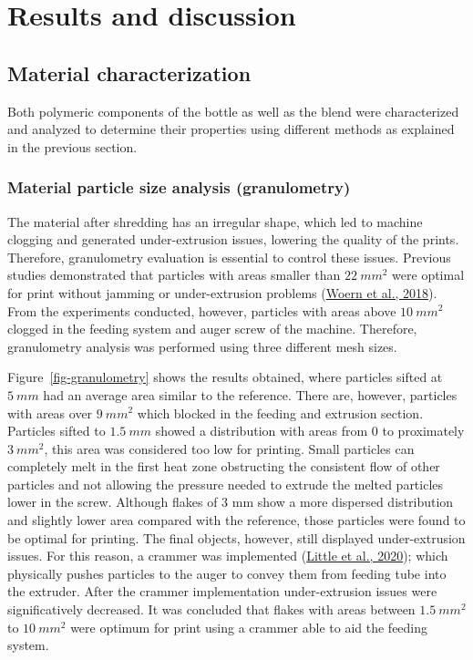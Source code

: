 \documentclass[
  12pt,
  number,
  review]{elsarticle}
\begin{document}
\hypertarget{results-and-discussion}{%
\section{Results and discussion}\label{results-and-discussion}}

\hypertarget{material-characterization}{%
\subsection{Material characterization}\label{material-characterization}}

Both polymeric components of the bottle as well as the blend were
characterized and analyzed to determine their properties using different
methods as explained in the previous section.

\hypertarget{material-particle-size-analysis-granulometry}{%
\subsubsection{Material particle size analysis
(granulometry)}\label{material-particle-size-analysis-granulometry}}

The material after shredding has an irregular shape, which led to
machine clogging and generated under-extrusion issues, lowering the
quality of the prints. Therefore, granulometry evaluation is essential
to control these issues. Previous studies demonstrated that particles
with areas smaller than \(22~mm^{2}\) were optimal for print without
jamming or under-extrusion problems
(\protect\hyperlink{ref-woern2018}{Woern et al., 2018}). From the
experiments conducted, however, particles with areas above \(10~mm^{2}\)
clogged in the feeding system and auger screw of the machine. Therefore,
granulometry analysis was performed using three different mesh sizes.

Figure~\ref{fig-granulometry} shows the results obtained, where
particles sifted at \(5~mm\) had an average area similar to the
reference. There are, however, particles with areas over \(9~mm^{2}\)
which blocked in the feeding and extrusion section. Particles sifted to
\(1.5~mm\) showed a distribution with areas from 0 to proximately
\(3~mm^{2}\), this area was considered too low for printing. Small
particles can completely melt in the first heat zone obstructing the
consistent flow of other particles and not allowing the pressure needed
to extrude the melted particles lower in the screw. Although flakes of 3
mm show a more dispersed distribution and slightly lower area compared
with the reference, those particles were found to be optimal for
printing. The final objects, however, still displayed under-extrusion
issues. For this reason, a crammer was implemented
(\protect\hyperlink{ref-little2020}{Little et al., 2020}); which
physically pushes particles to the auger to convey them from feeding
tube into the extruder. After the crammer implementation under-extrusion
issues were significatively decreased. It was concluded that flakes with
areas between \(1.5~mm^{2}\) to \(10~mm^{2}\) were optimum for print
using a crammer able to aid the feeding system.
\end{document}
